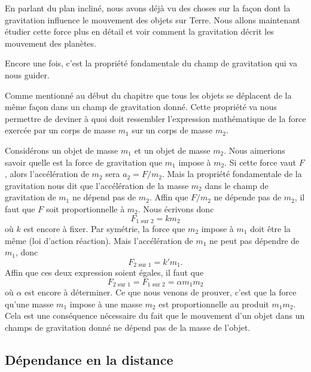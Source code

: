 \documentclass[a4paper,12pt]{book}
\theoremstyle{mes_exemples}	\newtheorem{exemple}[numtho]{Exemple}
\theoremstyle{mes_tho}
\begin{document}
En parlant du plan incliné, nous avons déjà vu des choses sur la façon dont la gravitation influence le mouvement des objets sur Terre. Nous allons maintenant étudier cette force plus en détail et voir comment la gravitation décrit les mouvement des planètes.

Encore une fois, c'est la propriété fondamentale du champ de gravitation qui va nous guider.

\begin{idee}
	Comme mentionné au début du chapitre que tous les objets se déplacent de la même façon dans un champ de gravitation donné. Cette propriété va nous permettre de deviner à quoi doit ressembler l'expression mathématique de la force exercée par un corps de masse $m_1$ sur un corps de masse $m_2$.
\end{idee}

Considérons un objet de masse $m_1$ et un objet de masse $m_2$. Nous aimerions savoir quelle est la force de gravitation que $m_1$ impose à $m_2$. Si cette force vaut $F$, alors l'accélération de $m_2$ sera $a_2=F/m_2$. Mais la propriété fondamentale de la gravitation nous dit que l'accélération de la masse $m_2$ dans le champ de gravitation de $m_1$ ne dépend pas de $m_2$. Affin que $F/m_2$ ne dépende pas de $m_2$, il faut que $F$ soit proportionnelle à $m_2$. Nous écrivons donc
\begin{equation}
	F_{\text{1 sur 2}}=k m_2
\end{equation}
où $k$ est encore à fixer. Par symétrie, la force que $m_2$ impose à $m_1$ doit être la même (loi d'action réaction). Mais l'accélération de $m_1$ ne peut pas dépendre de $m_1$, donc
\begin{equation}
	F_{\text{2 sur 1}}=k' m_1.
\end{equation}
Affin que ces deux expression soient égales, il faut que
\begin{equation}
	F_{\text{2 sur 1}}=F_{\text{1 sur 2}}=\alpha m_1 m_2
\end{equation}
où $\alpha$ est encore à déterminer. Ce que nous venons de prouver, c'est que la force qu'une masse $m_1$ impose à une masse $m_2$ est proportionnelle au produit $m_1m_2$. Cela est une conséquence nécessaire du fait que le mouvement d'un objet dans un champs de gravitation donné ne dépend pas de la masse de l'objet.

\subsection{Dépendance en la distance}
\end{document}
